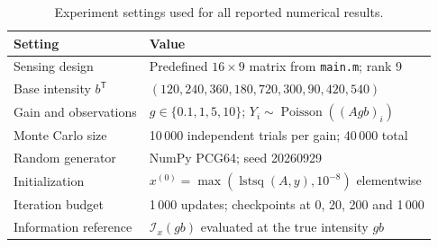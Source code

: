 \documentclass[11pt,a4paper]{article}
\newcommand{\Pois}{\operatorname{Poisson}}
\begin{document}
\begin{table}[H]\small
\caption{Experiment settings used for all reported numerical results.}
\begin{tabularx}{\linewidth}{@{}lX@{}}\toprule
Setting & Value\\\midrule
Sensing design & Predefined $16\times9$ matrix from \texttt{main.m}; rank 9\\
Base intensity $b^\mathsf T$ & $(120,240,360,180,720,300,90,420,540)$\\
Gain and observations & $g\in\{0.1,1,5,10\}$; $Y_i\sim\Pois((Agb)_i)$\\
Monte Carlo size & 10\,000 independent trials per gain; 40\,000 total\\
Random generator & NumPy PCG64; seed 20260929\\
Initialization & $x^{(0)}=\max(\operatorname{lstsq}(A,y),10^{-8})$ elementwise\\
Iteration budget & 1\,000 updates; checkpoints at 0, 20, 200 and 1\,000\\
Information reference & $\mathcal I_x(gb)$ evaluated at the true intensity $gb$\\\bottomrule
\end{tabularx}
\end{table}
\end{document}
